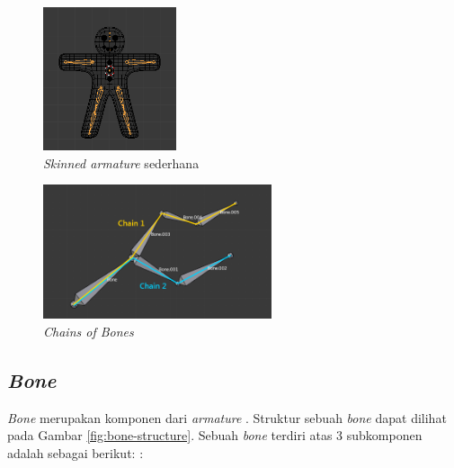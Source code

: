 \begin{figure}[ht]
    \centering
    \includegraphics[width=0.35\textwidth]{resources/chapter-2-basic-armature.png}
    \caption{\textit{Skinned armature} sederhana \parencite{blender-armature-structure}}
    \label{fig:basic-armature}
\end{figure}

\begin{figure}[ht]
    \centering
    \includegraphics[width=0.6\textwidth]{resources/chapter-2-chain-of-bones.png}
    \caption{\textit{Chains of Bones} \parencite{blender-armature-structure}}
    \label{fig:chains-of-bones}
\end{figure}

\subsection{\textit{Bone}}

\textit{Bone} merupakan komponen dari \textit{armature}
\parencite{blender-bones-introduction}. Struktur sebuah \textit{bone} dapat
dilihat pada Gambar \ref{fig:bone-structure}. Sebuah \textit{bone} terdiri atas
3 subkomponen adalah sebagai berikut:
\parencite{blender-bones-structure,blender-glossary}:

